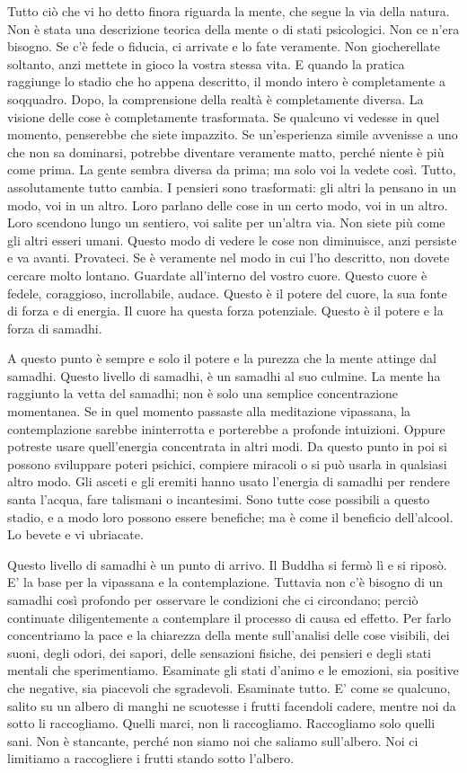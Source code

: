Tutto ciò che vi ho detto finora riguarda la mente, che segue la via
della natura. Non è stata una descrizione teorica della mente o di stati
psicologici. Non ce n'era bisogno. Se c'è fede o fiducia, ci arrivate e
lo fate veramente. Non giocherellate soltanto, anzi mettete in gioco la
vostra stessa vita. E quando la pratica raggiunge lo stadio che ho
appena descritto, il mondo intero è completamente a soqquadro. Dopo, la
comprensione della realtà è completamente diversa. La visione delle cose
è completamente trasformata. Se qualcuno vi vedesse in quel momento,
penserebbe che siete impazzito. Se un'esperienza simile avvenisse a uno
che non sa dominarsi, potrebbe diventare veramente matto, perché niente
è più come prima. La gente sembra diversa da prima; ma solo voi la
vedete così. Tutto, assolutamente tutto cambia. I pensieri sono
trasformati: gli altri la pensano in un modo, voi in un altro. Loro
parlano delle cose in un certo modo, voi in un altro. Loro scendono
lungo un sentiero, voi salite per un'altra via. Non siete più come gli
altri esseri umani. Questo modo di vedere le cose non diminuisce, anzi
persiste e va avanti. Provateci. Se è veramente nel modo in cui l'ho
descritto, non dovete cercare molto lontano. Guardate all'interno del
vostro cuore. Questo cuore è fedele, coraggioso, incrollabile, audace.
Questo è il potere del cuore, la sua fonte di forza e di energia. Il
cuore ha questa forza potenziale. Questo è il potere e la forza di
samadhi.

A questo punto è sempre e solo il potere e la purezza che la mente
attinge dal samadhi. Questo livello di samadhi, è un samadhi al suo
culmine. La mente ha raggiunto la vetta del samadhi; non è solo una
semplice concentrazione momentanea. Se in quel momento passaste alla
meditazione vipassana, la contemplazione sarebbe ininterrotta e
porterebbe a profonde intuizioni. Oppure potreste usare quell'energia
concentrata in altri modi. Da questo punto in poi si possono sviluppare
poteri psichici, compiere miracoli o si può usarla in qualsiasi altro
modo. Gli asceti e gli eremiti hanno usato l'energia di samadhi per
rendere santa l'acqua, fare talismani o incantesimi. Sono tutte cose
possibili a questo stadio, e a modo loro possono essere benefiche; ma è
come il beneficio dell'alcool. Lo bevete e vi ubriacate.

Questo livello di samadhi è un punto di arrivo. Il Buddha si fermò lì e
si riposò. E' la base per la vipassana e la contemplazione. Tuttavia non
c'è bisogno di un samadhi così profondo per osservare le condizioni che
ci circondano; perciò continuate diligentemente a contemplare il
processo di causa ed effetto. Per farlo concentriamo la pace e la
chiarezza della mente sull'analisi delle cose visibili, dei suoni, degli
odori, dei sapori, delle sensazioni fisiche, dei pensieri e degli stati
mentali che sperimentiamo. Esaminate gli stati d'animo e le emozioni,
sia positive che negative, sia piacevoli che sgradevoli. Esaminate
tutto. E' come se qualcuno, salito su un albero di manghi ne scuotesse i
frutti facendoli cadere, mentre noi da sotto li raccogliamo. Quelli
marci, non li raccogliamo. Raccogliamo solo quelli sani. Non è
stancante, perché non siamo noi che saliamo sull'albero. Noi ci
limitiamo a raccogliere i frutti stando sotto l'albero.

